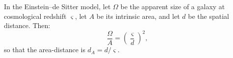 In the Einstein--de Sitter model, let $\Omega$ be the apparent size of a galaxy at cosmological redshift $\varsigma$, let $A$ be its intrinsic area, and let $d$ be the spatial distance. Then:
$$\frac{\Omega}{A} = \left(\frac{\varsigma}{d}\right)^2,$$
so that the area-distance is $d_A = d/\varsigma$.
